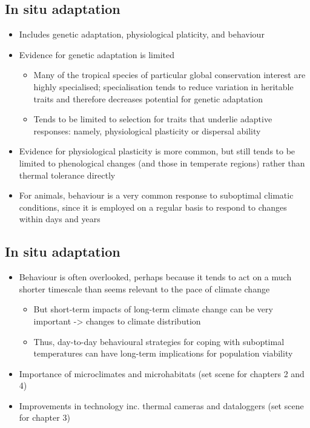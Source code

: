 \documentclass[12pt,a4paper,]{report}
\providecommand{\tightlist}{%
  \setlength{\itemsep}{0pt}\setlength{\parskip}{0pt}}
\theoremstyle{definition}
\theoremstyle{definition}
\theoremstyle{definition}
\theoremstyle{remark}
\begin{document}
\subsection{In situ adaptation}\label{in-situ-adaptation}

\begin{itemize}
\tightlist
\item
  Includes genetic adaptation, physiological platicity, and behaviour
\item
  Evidence for genetic adaptation is limited

  \begin{itemize}
  \tightlist
  \item
    Many of the tropical species of particular global conservation
    interest are highly specialised; specialisation tends to reduce
    variation in heritable traits and therefore decreases potential for
    genetic adaptation \citep{williams_towards_2008}
  \item
    Tends to be limited to selection for traits that underlie adaptive
    responses: namely, physiological plasticity or dispersal ability
  \end{itemize}
\item
  Evidence for physiological plasticity is more common, but still tends
  to be limited to phenological changes (and those in temperate regions)
  rather than thermal tolerance directly
\item
  For animals, behaviour is a very common response to suboptimal
  climatic conditions, since it is employed on a regular basis to
  respond to changes within days and years
\end{itemize}

\subsection{In situ adaptation}\label{in-situ-adaptation-1}

\begin{itemize}
\tightlist
\item
  Behaviour is often overlooked, perhaps because it tends to act on a
  much shorter timescale than seems relevant to the pace of climate
  change

  \begin{itemize}
  \tightlist
  \item
    But short-term impacts of long-term climate change can be very
    important -\textgreater{} changes to climate distribution
  \item
    Thus, day-to-day behavioural strategies for coping with suboptimal
    temperatures can have long-term implications for population
    viability
  \end{itemize}
\item
  Importance of microclimates and microhabitats (set scene for chapters
  2 and 4)
\item
  Improvements in technology inc. thermal cameras and dataloggers (set
  scene for chapter 3)
\end{itemize}
\end{document}

